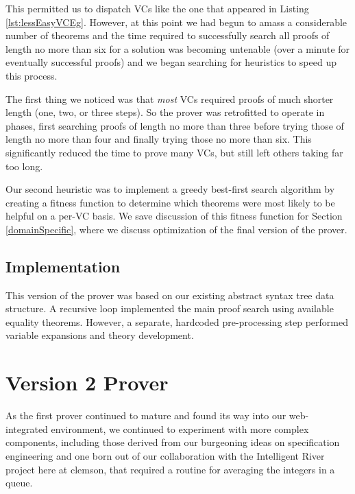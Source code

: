 This permitted us to dispatch VCs like the one that appeared in Listing \ref{lst:lessEasyVCEg}.  However, at this point we had begun to amass a considerable number of theorems and the time required to successfully search all proofs of length no more than six for a solution was becoming untenable (over a minute for eventually successful proofs) and we began searching for heuristics to speed up this process.

The first thing we noticed was that \emph{most} VCs required proofs of much shorter length (one, two, or three steps).  So the prover was retrofitted to operate in phases, first searching proofs of length no more than three before trying those of length no more than four and finally trying those no more than six.  This significantly reduced the time to prove many VCs, but still left others taking far too long.

Our second heuristic was to implement a greedy best-first search algorithm by creating a fitness function to determine which theorems were most likely to be helpful on a per-VC basis.  We save discussion of this fitness function for Section \ref{domainSpecific}, where we discuss optimization of the final version of the prover.

	\subsection{Implementation}

This version of the prover was based on our existing abstract syntax tree data structure.  A recursive loop implemented the main proof search using available equality theorems.  However, a separate, hardcoded pre-processing step performed variable expansions and theory development.


\section{Version 2 Prover\label{proverV2}}

As the first prover continued to mature and found its way into our web-integrated environment, we continued to experiment with more complex components, including those derived from our burgeoning ideas on specification engineering\cite{smithSpecificationAbstractions} and one born out of our collaboration with the Intelligent River project here at clemson, that required a routine for averaging the integers in a queue\cite{regula2012case}.  

